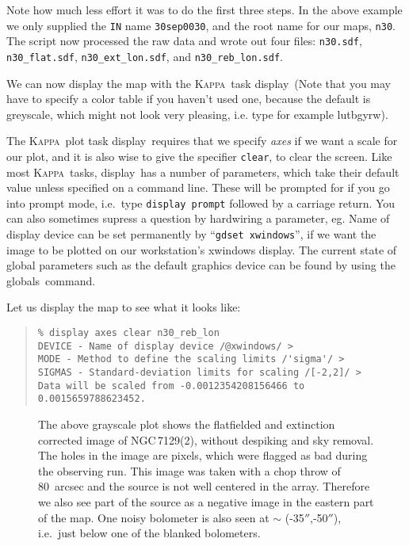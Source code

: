 \documentclass[twoside,11pt]{article}
\newenvironment{myquote}{\begin{quote}\begin{small}}{\end{small}\end{quote}}
\newcommand{\Kappa}{\xref{\textsc{Kappa}}{sun95}{}}
\newcommand{\task}[1]{\textsf{#1}}
\newcommand{\param}[1]{\texttt{#1}}
\newcommand{\display}{\xref{\task{display}}{sun95}{DISPLAY}}
\newcommand{\globals}{\xref{\task{globals}}{sun95}{GLOBALS}}
\newcommand{\gdset}{\xref{\task{gdset}}{sun95}{GDSET}}
\newcommand{\lutbgyrw}{\xref{\task{lutbgyrw}}{sun95}{LUTBGYRW}}
\newcommand{\xref}[3]{#1}
\begin{document}
Note how much less effort it was to do the first three steps. In the above
example we only supplied the \param{IN} name \texttt{30sep0030}, and the root
name for our maps, \texttt{n30}. The script now processed the raw data and
wrote out four files: \texttt{n30.sdf}, \texttt{n30\_flat.sdf},
\texttt{n30\_ext\_lon.sdf}, and \texttt{n30\_reb\_lon.sdf}.

We can now display the map with the \Kappa\ task \display\ (Note that you
may have to specify a color table if you haven't used one, because the
default is greyscale, which might not look very pleasing, i.e. type for
example \lutbgyrw).

The \Kappa\ plot task \display\ requires that we specify {\it axes} if we want
a scale for our plot, and it is also wise to give the specifier \param{clear},
to clear the screen. Like most \Kappa\ tasks, \display\ has a number of
parameters, which take their default value unless specified on a command
line. These will be prompted for if you go into prompt mode, i.e.\ type
\texttt{\display\ prompt} followed by a carriage return.  You can also
sometimes supress a question by hardwiring a parameter, eg. Name of display
device can be set permanently by ``\texttt{\gdset\ xwindows}'', if we want the
image to be plotted on our workstation's xwindows display. The current state of
global parameters such as the default graphics device can be found by using
the \globals\ command.


Let us display the map to see what it looks like:


\begin{myquote} \begin{verbatim}
% display axes clear n30_reb_lon
DEVICE - Name of display device /@xwindows/ > 
MODE - Method to define the scaling limits /'sigma'/ > 
SIGMAS - Standard-deviation limits for scaling /[-2,2]/ > 
Data will be scaled from -0.0012354208156466 to 0.0015659788623452.
\end{verbatim} \end{myquote}

\begin{figure}
\begin{center}
\caption{The above grayscale plot shows the flatfielded and extinction
corrected image of NGC\,7129(2), without despiking and sky removal. The
holes in the image are pixels, which were flagged as bad during the
observing run. This image was taken with a chop throw of 80~arcsec and the
source is not well centered in the array. Therefore we also see part
of the source as a negative image in the eastern part of the map. One
noisy bolometer is also seen at $\sim$ (-35$''$,-50$''$), i.e.\ just below one
of the blanked bolometers.  }
\label{fig:raw1}
\end{center}
\end{figure}
\end{document}
